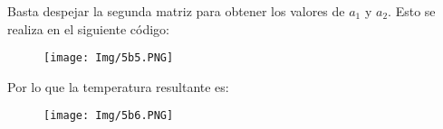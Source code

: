 \documentclass[11pt]{article}
\begin{document}
	Basta despejar la segunda matriz para obtener los valores de $a_1$ y $a_2$. Esto se realiza en el siguiente código:
	
	\begin{figure}[h]
		\centering
		\texttt{[image: Img/5b5.PNG]}
	\end{figure}
	
	Por lo que la temperatura resultante es:
	\begin{figure}[h]
		\centering
		\texttt{[image: Img/5b6.PNG]}
	\end{figure}
	
	
\end{document}
